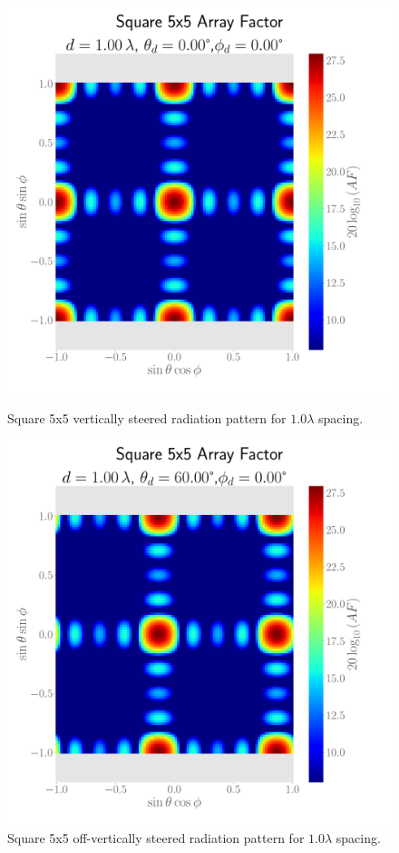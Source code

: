 \begin{figure}[H]
  \begin{minipage}[t]{0.45\textwidth}
    \centering
    \includegraphics[width=\textwidth]{graphics/task_1/square-1.00-lambda-0.00-theta-0.00-phi-radpat.pdf}
    \caption{Square 5x5 vertically steered radiation pattern for $1.0\lambda$ spacing.}\label{fig:rad-square-1.0-0}
  \end{minipage}\hfill
  \begin{minipage}[t]{0.45\textwidth}
    \centering
    \includegraphics[width=\textwidth]{graphics/task_1/square-1.00-lambda-60.00-theta-0.00-phi-radpat.pdf}
    \caption{Square 5x5 off-vertically steered radiation pattern for $1.0\lambda$ spacing.}\label{fig:rad-square-1.0-60}
   \end{minipage}
\end{figure}

